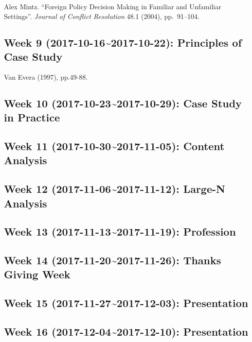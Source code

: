 \documentclass[11pt,]{article}
\begin{document}
Alex Mintz. ``Foreign Policy Decision Making in Familiar and Unfamiliar
Settings''. \emph{Journal of Conflict Resolution} 48.1 (2004),
pp.~91--104.

\subsection{Week 9 (2017-10-16\textasciitilde{}2017-10-22): Principles
of Case
Study}\label{week-9-2017-10-162017-10-22-principles-of-case-study}

Van Evera (1997), pp.49-88.

\subsection{Week 10 (2017-10-23\textasciitilde{}2017-10-29): Case Study
in Practice}\label{week-10-2017-10-232017-10-29-case-study-in-practice}

\subsection{Week 11 (2017-10-30\textasciitilde{}2017-11-05): Content
Analysis}\label{week-11-2017-10-302017-11-05-content-analysis}

\subsection{Week 12 (2017-11-06\textasciitilde{}2017-11-12): Large-N
Analysis}\label{week-12-2017-11-062017-11-12-large-n-analysis}

\subsection{Week 13 (2017-11-13\textasciitilde{}2017-11-19):
Profession}\label{week-13-2017-11-132017-11-19-profession}

\subsection{Week 14 (2017-11-20\textasciitilde{}2017-11-26): Thanks
Giving Week}\label{week-14-2017-11-202017-11-26-thanks-giving-week}

\subsection{Week 15 (2017-11-27\textasciitilde{}2017-12-03):
Presentation}\label{week-15-2017-11-272017-12-03-presentation}

\subsection{Week 16 (2017-12-04\textasciitilde{}2017-12-10):
Presentation}\label{week-16-2017-12-042017-12-10-presentation}
\end{document}
